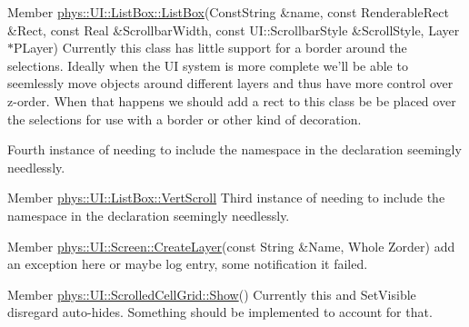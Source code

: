 \label{todo__todo000029}
\hypertarget{todo__todo000029}{}
 
\begin{DoxyDescription}
\item[Member \hyperlink{classphys_1_1UI_1_1ListBox_a01fe1d84b537fac03244a023406a839e}{phys::UI::ListBox::ListBox}(ConstString \&name, const RenderableRect \&Rect, const Real \&ScrollbarWidth, const UI::ScrollbarStyle \&ScrollStyle, Layer $\ast$PLayer) ]Currently this class has little support for a border around the selections. Ideally when the UI system is more complete we'll be able to seemlessly move objects around different layers and thus have more control over z-\/order. When that happens we should add a rect to this class be be placed over the selections for use with a border or other kind of decoration. 

Fourth instance of needing to include the namespace in the declaration seemingly needlessly. 
\end{DoxyDescription}

\label{todo__todo000031}
\hypertarget{todo__todo000031}{}
 
\begin{DoxyDescription}
\item[Member \hyperlink{classphys_1_1UI_1_1ListBox_ab2b012b345ff4bb1a5b228fef88d895c}{phys::UI::ListBox::VertScroll} ]Third instance of needing to include the namespace in the declaration seemingly needlessly. 
\end{DoxyDescription}

\label{todo__todo000032}
\hypertarget{todo__todo000032}{}
 
\begin{DoxyDescription}
\item[Member \hyperlink{classphys_1_1UI_1_1Screen_ad3b73f039f840fd2b2dc20219c428e9d}{phys::UI::Screen::CreateLayer}(const String \&Name, Whole Zorder) ]add an exception here or maybe log entry, some notification it failed. 
\end{DoxyDescription}

\label{todo__todo000033}
\hypertarget{todo__todo000033}{}
 
\begin{DoxyDescription}
\item[Member \hyperlink{classphys_1_1UI_1_1ScrolledCellGrid_af75c87ada3a1bac3dda208485ebc5f94}{phys::UI::ScrolledCellGrid::Show}() ]Currently this and SetVisible disregard auto-\/hides. Something should be implemented to account for that. 
\end{DoxyDescription}

